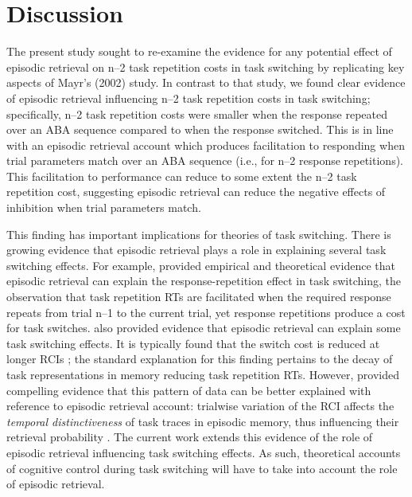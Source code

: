 \documentclass[a4paper, man, natbib]{apa6}
\begin{document}
\section{Discussion}

The present study sought to re-examine the evidence for any potential effect of episodic retrieval on n--2 task repetition costs in task switching by replicating key aspects of Mayr's (2002) study. In contrast to that study, we found clear evidence of episodic retrieval influencing n--2 task repetition costs in task switching; specifically, n--2 task repetition costs were smaller when the response repeated over an ABA sequence compared to when the response switched. This is in line with an episodic retrieval account which produces facilitation to responding when trial parameters match over an ABA sequence (i.e., for n--2 response repetitions). This facilitation to performance can reduce to some extent the n--2 task repetition cost, suggesting episodic retrieval can reduce the negative effects of inhibition when trial parameters match.

This finding has important implications for theories of task switching. There is growing evidence that episodic retrieval plays a role in explaining several task switching effects. For example, \cite{Altmann2011} provided empirical and theoretical evidence that episodic retrieval can explain the response-repetition effect in task switching, the observation that task repetition RTs are facilitated when the required response repeats from trial n--1 to the current trial, yet response repetitions produce a cost for task switches. \cite{Horoufchin2011a} \citep[see also][]{Horoufchin2011} also provided evidence that episodic retrieval can explain some task switching effects. It is typically found that the switch cost is reduced at longer RCIs \cite[e.g.,][]{Meiran2000a}; the standard explanation for this finding pertains to the decay of task representations in memory reducing task repetition RTs. However, \cite{Horoufchin2011a} provided compelling evidence that this pattern of data can be better explained with reference to episodic retrieval account: trialwise variation of the RCI affects the \emph{temporal distinctiveness} of task traces in episodic memory, thus influencing their retrieval probability \citep{Brown2007,Grange2015}. The current work extends this evidence of the role of episodic retrieval influencing task switching effects. As such, theoretical accounts of cognitive control during task switching will have to take into account the role of episodic retrieval. 
\end{document}

